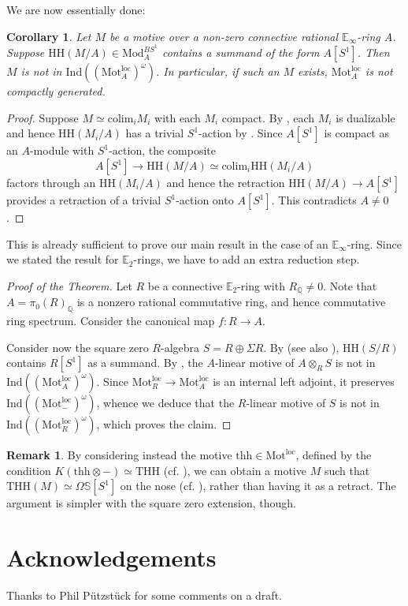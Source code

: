\documentclass{article}
\newtheorem{cor}[cor]{Corollary}
\theoremstyle{definition}
\newtheorem{rmk}[rmk]{Remark}
\newcommand{\cat}{\mathrm}
\newcommand{\Sph}{\mathbb S}
\newcommand{\Mod}{\cat{Mod}}
\newcommand{\Mot}{\cat{Mot}^{\mathrm{loc}}}
\newcommand{\HH}{\mathrm{HH}}
\newcommand{\THH}{\mathrm{THH}}
\newcommand{\Ind}{\mathrm{Ind}}
\newcommand{\colim}{\mathrm{colim}}
\newcommand{\Q}{\mathbb{Q}}
\begin{document}
We are now essentially done: 
\begin{cor}\label{cor:main}
    Let $M$ be a motive over a non-zero connective rational $\mathbb E_\infty$-ring $A$. Suppose $\HH(M/A)\in \Mod_A^{BS^1}$ contains a summand of the form $A[S^1]$. Then $M$ is not in $\Ind((\Mot_A)^\omega)$. In particular, if such an $M$ exists, $\Mot_A$ is not compactly generated.
\end{cor}
\begin{proof}
    Suppose $M\simeq \colim_i M_i$ with each $M_i$ compact. By , each $M_i$ is dualizable and hence $\HH(M_i/A)$ has a trivial $S^1$-action by . Since $A[S^1]$ is compact as an $A$-module with $S^1$-action, the composite $$A[S^1]\to \HH(M/A)\simeq \colim_i \HH(M_i/A)$$ factors through an $\HH(M_i/A)$ and hence the retraction $\HH(M/A)\to A[S^1]$ provides a retraction of a trivial $S^1$-action onto $A[S^1]$. This contradicts $A\neq 0$. 
\end{proof}
This is already sufficient to prove our main result in the case of an $\mathbb E_\infty$-ring. Since we stated the result for $\mathbb E_2$-rings, we have to add an extra reduction step.
\begin{proof}[Proof of the Theorem]
    Let $R$ be a connective $\mathbb E_2$-ring with $R_\Q\neq 0$. Note that $A=\pi_0(R)_\Q$ is a nonzero rational commutative ring, and hence commutative ring spectrum. Consider the canonical map $f:R\to A$. 

    Consider now the square zero $R$-algebra $S=R\oplus \Sigma R$. By \cite{hesselholt} (see also \cite[Proposition 4.5.1]{raskin}), $\HH(S/R)$ contains $R[S^1]$ as a summand. By , the $A$-linear motive of $A\otimes_R S$ is not in $\Ind((\Mot_A)^\omega)$. Since $\Mot_R\to \Mot_A$ is an internal left adjoint, it preserves $\Ind((\Mot_{-})^\omega)$, whence we deduce that the $R$-linear motive of $S$ is not in $\Ind((\Mot_R)^\omega)$, which proves the claim. 
\end{proof}
\begin{rmk}
    By considering instead the motive $\mathrm{thh} \in \Mot$, defined by the condition $K(\mathrm{thh}\otimes -)\simeq \THH$ (cf. ), we can obtain a motive $M$ such that $\THH(M)\simeq \Omega \Sph[S^1]$ on the nose (cf. \cite[Corollary 2.2]{EndTHH}), rather than having it as a retract. The argument is simpler with the square zero extension, though. 
\end{rmk}
\section*{Acknowledgements}
Thanks to Phil Pützstück for some comments on a draft.
\end{document}

